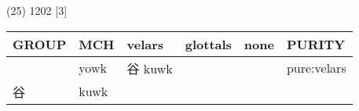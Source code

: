 \documentclass[14pt,a4paper]{scrartcl}
\begin{document}
(25) 1202 {[}3{]}

\begin{longtable}[c]{@{}llllll@{}}
\toprule
\begin{minipage}[b]{0.14\columnwidth}\raggedright\strut
GROUP
\strut\end{minipage} &
\begin{minipage}[b]{0.14\columnwidth}\raggedright\strut
MCH
\strut\end{minipage} &
\begin{minipage}[b]{0.14\columnwidth}\raggedright\strut
velars
\strut\end{minipage} &
\begin{minipage}[b]{0.14\columnwidth}\raggedright\strut
glottals
\strut\end{minipage} &
\begin{minipage}[b]{0.14\columnwidth}\raggedright\strut
none
\strut\end{minipage} &
\begin{minipage}[b]{0.14\columnwidth}\raggedright\strut
PURITY
\strut\end{minipage}\tabularnewline
\midrule
\endhead
\begin{minipage}[t]{0.14\columnwidth}\raggedright\strut
𠔌
\strut\end{minipage} &
\begin{minipage}[t]{0.14\columnwidth}\raggedright\strut
yowk
\strut\end{minipage} &
\begin{minipage}[t]{0.14\columnwidth}\raggedright\strut
谷 kuwk
\strut\end{minipage} &
\begin{minipage}[t]{0.14\columnwidth}\raggedright\strut
\strut\end{minipage} &
\begin{minipage}[t]{0.14\columnwidth}\raggedright\strut
\strut\end{minipage} &
\begin{minipage}[t]{0.14\columnwidth}\raggedright\strut
pure:velars
\strut\end{minipage}\tabularnewline
\begin{minipage}[t]{0.14\columnwidth}\raggedright\strut
谷
\strut\end{minipage} &
\begin{minipage}[t]{0.14\columnwidth}\raggedright\strut
kuwk
\strut\end{minipage} &
\begin{minipage}[t]{0.14\columnwidth}\raggedright\strut
\strut\end{minipage} &

\end{longtable}
\end{document}
